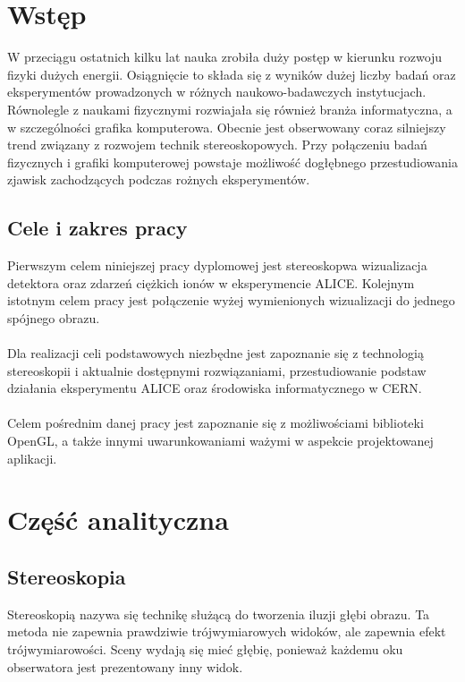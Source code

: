 
\graphicspath{{images/}}



\tableofcontents
\thispagestyle{empty}
\thesisstyle
\newpage 

\section[Wstęp]{Wstęp}
W przeciągu ostatnich kilku lat nauka zrobiła duży postęp w kierunku rozwoju fizyki dużych energii. Osiągnięcie to składa się z wyników dużej liczby badań oraz eksperymentów prowadzonych w różnych naukowo-badawczych instytucjach. Równolegle z naukami fizycznymi rozwiajała się również branża informatyczna, a w szczególności grafika komputerowa. Obecnie jest obserwowany coraz silniejszy trend związany z rozwojem technik stereoskopowych. Przy połączeniu badań fizycznych i grafiki komputerowej powstaje możliwość dogłębnego przestudiowania zjawisk zachodzących podczas rożnych eksperymentów.

\subsection{Cele i zakres pracy}
Pierwszym celem niniejszej pracy dyplomowej jest stereoskopwa wizualizacja detektora oraz zdarzeń ciężkich ionów w eksperymencie ALICE. Kolejnym istotnym celem pracy jest połączenie wyżej wymienionych wizualizacji do jednego spójnego obrazu. 
\paragraph{}
Dla realizacji celi podstawowych niezbędne jest zapoznanie się z technologią stereoskopii i aktualnie dostępnymi rozwiązaniami, przestudiowanie podstaw działania eksperymentu ALICE oraz środowiska informatycznego w CERN. \paragraph{}
Celem pośrednim danej pracy jest zapoznanie się z możliwościami biblioteki OpenGL, a także innymi uwarunkowaniami ważymi w aspekcie projektowanej aplikacji.

\newpage
\section[Część analityczna]{Część analityczna}

\subsection{Stereoskopia}
Stereoskopią nazywa się technikę służącą do tworzenia iluzji głębi obrazu. Ta metoda nie zapewnia prawdziwie trójwymiarowych widoków, ale zapewnia efekt trójwymiarowości. Sceny wydają się mieć głębię, ponieważ każdemu oku obserwatora jest prezentowany inny widok. 
